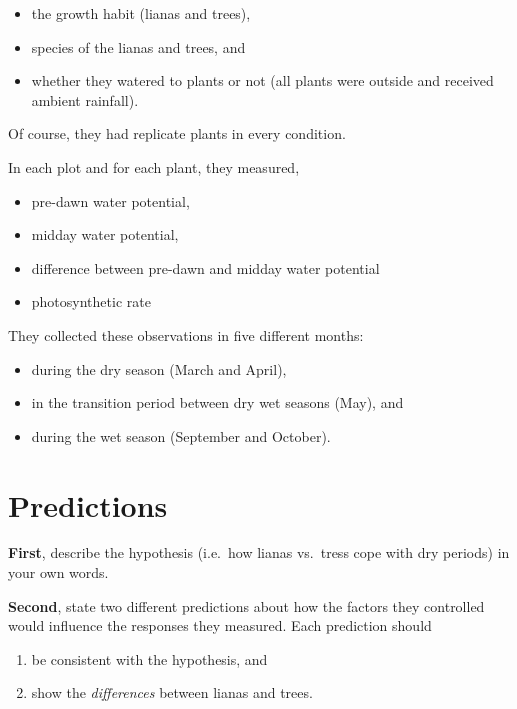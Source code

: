 \documentclass[
  letterpaper,
  DIV=11,
  numbers=noendperiod]{scrreprt}
\providecommand{\tightlist}{%
  \setlength{\itemsep}{0pt}\setlength{\parskip}{0pt}}
\begin{document}
\begin{itemize}
\tightlist
\item
  the growth habit (lianas and trees),
\item
  species of the lianas and trees, and
\item
  whether they watered to plants or not (all plants were outside and
  received ambient rainfall).
\end{itemize}

Of course, they had replicate plants in every condition.

In each plot and for each plant, they measured,

\begin{itemize}
\tightlist
\item
  pre-dawn water potential,
\item
  midday water potential,
\item
  difference between pre-dawn and midday water potential
\item
  photosynthetic rate
\end{itemize}

They collected these observations in five different months:

\begin{itemize}
\tightlist
\item
  during the dry season (March and April),
\item
  in the transition period between dry wet seasons (May), and
\item
  during the wet season (September and October).
\end{itemize}

\section{Predictions}\label{predictions-1}

\textbf{First}, describe the hypothesis (i.e.~how lianas vs.~tress cope
with dry periods) in your own words.

\textbf{Second}, state two different predictions about how the factors
they controlled would influence the responses they measured. Each
prediction should

\begin{enumerate}
\def\labelenumi{\arabic{enumi}.}
\tightlist
\item
  be consistent with the hypothesis, and
\item
  show the \emph{differences} between lianas and trees.
\end{enumerate}
\end{document}

